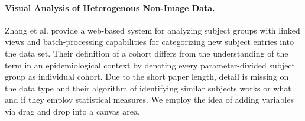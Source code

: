 \documentclass[journal]{style/vgtc} 			          %
\newcommand{\add}[1]{\textcolor{blue}{\uline{#1}}}
\begin{document}
\paragraph{Visual Analysis of Heterogenous Non-Image Data.}
Zhang et al. \cite{Zhang2012} provide a web-based system for analyzing subject groups with linked views and batch-processing capabilities for categorizing new subject entries into the data set.
%
Their definition of a cohort differs from the understanding of the term in an epidemiological context by denoting every parameter-divided subject group as individual cohort.
%
Due to the short paper length, detail is missing on the data type and their algorithm of identifying similar subjects works or what and if they employ statistical measures.
%
We employ the idea of adding variables via drag and drop into a canvas area.
\end{document}

